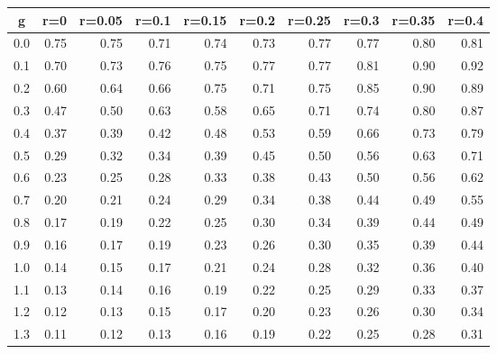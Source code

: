 %
\begin{table}[!tbp]
 \begin{center}
 \begin{tabular}{rrrrrrrrrr}\hline\hline
\multicolumn{1}{c}{g}&\multicolumn{1}{c}{r=0}&\multicolumn{1}{c}{r=0.05}&\multicolumn{1}{c}{r=0.1}&\multicolumn{1}{c}{r=0.15}&\multicolumn{1}{c}{r=0.2}&\multicolumn{1}{c}{r=0.25}&\multicolumn{1}{c}{r=0.3}&\multicolumn{1}{c}{r=0.35}&\multicolumn{1}{c}{r=0.4}\tabularnewline
\hline
0.0&0.75&0.75&0.71&0.74&0.73&0.77&0.77&0.80&0.81\tabularnewline
0.1&0.70&0.73&0.76&0.75&0.77&0.77&0.81&0.90&0.92\tabularnewline
0.2&0.60&0.64&0.66&0.75&0.71&0.75&0.85&0.90&0.89\tabularnewline
0.3&0.47&0.50&0.63&0.58&0.65&0.71&0.74&0.80&0.87\tabularnewline
0.4&0.37&0.39&0.42&0.48&0.53&0.59&0.66&0.73&0.79\tabularnewline
0.5&0.29&0.32&0.34&0.39&0.45&0.50&0.56&0.63&0.71\tabularnewline
0.6&0.23&0.25&0.28&0.33&0.38&0.43&0.50&0.56&0.62\tabularnewline
0.7&0.20&0.21&0.24&0.29&0.34&0.38&0.44&0.49&0.55\tabularnewline
0.8&0.17&0.19&0.22&0.25&0.30&0.34&0.39&0.44&0.49\tabularnewline
0.9&0.16&0.17&0.19&0.23&0.26&0.30&0.35&0.39&0.44\tabularnewline
1.0&0.14&0.15&0.17&0.21&0.24&0.28&0.32&0.36&0.40\tabularnewline
1.1&0.13&0.14&0.16&0.19&0.22&0.25&0.29&0.33&0.37\tabularnewline
1.2&0.12&0.13&0.15&0.17&0.20&0.23&0.26&0.30&0.34\tabularnewline
1.3&0.11&0.12&0.13&0.16&0.19&0.22&0.25&0.28&0.31\tabularnewline
\hline
\end{tabular}

\end{center}

\end{table}

